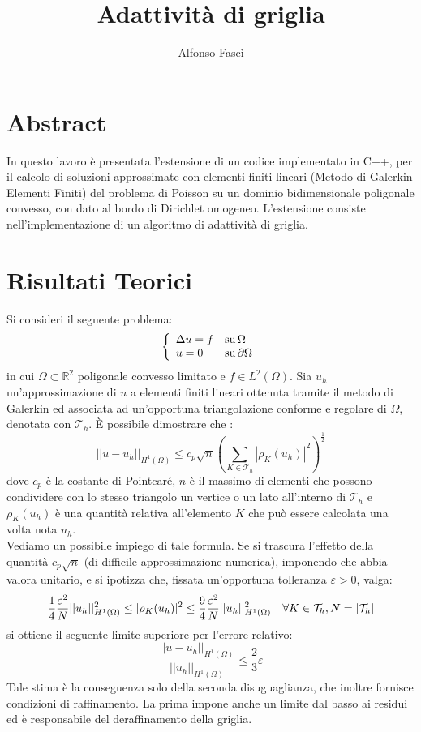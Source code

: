 \documentclass[a4paper,10pt,twoside]{amsart}
\title{Adattività di griglia}
\author{Alfonso Fascì}
\theoremstyle{remark}
\theoremstyle{definition}
\renewcommand{\epsilon}{\varepsilon}
\begin{document}
\maketitle

\section{Abstract}
In questo lavoro è presentata l'estensione di un codice implementato in C++, per il calcolo di soluzioni approssimate con elementi finiti lineari (Metodo di Galerkin Elementi Finiti) del problema di Poisson su un dominio bidimensionale poligonale convesso, con dato al bordo di Dirichlet omogeneo. L'estensione consiste nell'implementazione di un algoritmo di adattività di griglia.
\section{Risultati Teorici}
Si consideri il seguente problema:
\begin{equation}
\label{poisson}
\left\{
\begin{array}{ll}
\Delta u = f & {\rm su}\, \Omega \\
    u = 0 & {\rm su}\, \partial\Omega
\end{array}
\right.
\end{equation}
in cui $\Omega \subset \mathbb{R}^2$ poligonale convesso limitato e $f \in L^2(\Omega)$. Sia $u_h$ un'approssimazione di $u$ a elementi finiti lineari ottenuta tramite il metodo di Galerkin ed associata ad un'opportuna triangolazione conforme e regolare di $\Omega$, denotata con $\mathcal{T}_h$. \`E possibile dimostrare che \cite{quarteroni}:
\[
||u-u_h||_{H^1(\Omega)} \le c_p \sqrt{n} (\sum_{K \in \mathcal{T}_h} |\rho_K (u_h)|^2)^{\frac{1}{2}}
\]
dove $c_p$ è la costante di Pointcaré, $n$ è il massimo di elementi che possono condividere con lo stesso triangolo un vertice o un lato all'interno di $\mathcal{T}_h$ e $\rho_K(u_h)$ è una quantità relativa all'elemento $K$ che può essere calcolata una volta nota $u_h$.\\
Vediamo un possibile impiego di tale formula. Se si trascura l'effetto della quantità $c_p\sqrt{n}$ (di difficile approssimazione numerica), imponendo che abbia valora unitario, e si ipotizza che, fissata un'opportuna tolleranza $\epsilon > 0$, valga:
\begin{eqnarray}
\label{cond1}
\frac{1}{4} \frac{\epsilon^2}{N} ||u_h||^2_{H^1 (\Omega)} \le |\rho_K(u_h)|^2 \le \frac{9}{4} \frac{\epsilon^2}{N} ||u_h||^2_{H^1 (\Omega)} & & \forall K \in \mathcal{T}_h{\rm ,} \,N=|\mathcal{T}_h|
\end{eqnarray}
si ottiene il seguente limite superiore per l'errore relativo:
\[
\dfrac{||u-u_h||_{H^1 (\Omega)}}{||u_h||_{H^1 (\Omega)}} \le \frac{2}{3} \epsilon
\]
Tale stima è la conseguenza solo della seconda disuguaglianza, che inoltre fornisce condizioni di raffinamento. La prima impone anche un limite dal basso ai residui ed è responsabile del deraffinamento della griglia.
\end{document}
